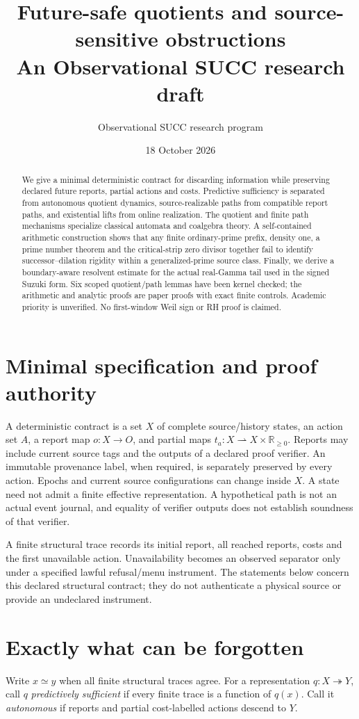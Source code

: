 \documentclass[11pt]{article}
\title{Future-safe quotients and source-sensitive obstructions\\\large An Observational SUCC research draft}
\author{Observational SUCC research program}
\date{18 October 2026}
\newcommand{\RR}{\mathbb R}
\begin{document}
\maketitle
\begin{abstract}
We give a minimal deterministic contract for discarding information while
preserving declared future reports, partial actions and costs. Predictive
sufficiency is separated from autonomous quotient dynamics, source-realizable
paths from compatible report paths, and existential lifts from online
realization. The quotient and finite path mechanisms specialize classical
automata and coalgebra theory. A self-contained arithmetic construction shows
that any finite ordinary-prime prefix, density one, a prime number theorem and
the critical-strip zero divisor together fail to identify successor--dilation
rigidity within a generalized-prime source class. Finally, we derive a
boundary-aware resolvent estimate for the actual real-Gamma tail used in the
signed Suzuki form. Six scoped quotient/path lemmas have been kernel checked;
the arithmetic and analytic proofs are paper proofs with exact finite controls.
Academic priority is unverified. No first-window Weil sign or RH proof is claimed.
\end{abstract}

\section{Minimal specification and proof authority}
A deterministic contract is a set $X$ of complete source/history states, an
action set $A$, a report map $o:X\to O$, and partial maps
$t_a:X\rightharpoonup X\times\RR_{\ge0}$. Reports may include current
source tags and the outputs of a declared proof verifier. An immutable
provenance label, when required, is separately preserved by every action.
Epochs and current source configurations can change inside $X$.
A state need not admit a finite effective representation. A hypothetical
path is not an actual event journal, and equality of verifier outputs does
not establish soundness of that verifier.

A finite structural trace records its initial report, all reached reports,
costs and the first unavailable action. Unavailability becomes an observed
separator only under a specified lawful refusal/menu instrument. The
statements below concern this declared structural contract; they do not
authenticate a physical source or provide an undeclared instrument.

\section{Exactly what can be forgotten}
Write $x\simeq y$ when all finite structural traces agree. For a representation
$q:X\twoheadrightarrow Y$, call $q$ \emph{predictively sufficient} if every
finite trace is a function of $q(x)$. Call it \emph{autonomous} if reports and
partial cost-labelled actions descend to $Y$.
\end{document}
